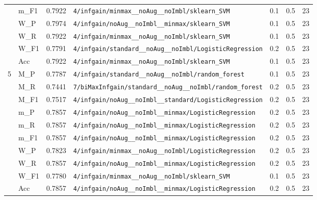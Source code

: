 \begin{table}[htbp]
\begin{tabular}{|c|l|c|>{\ttfamily\footnotesize}p{7.2cm}|c|c|c|}
 & m\_F1 & 0.7922 & \texttt{4/infgain/minmax\_\_noAug\_\_noImbl/sklearn\_SVM} & 0.1 & 0.5  & 23 \\ 
 & W\_P & 0.7974 & \texttt{4/infgain/noAug\_\_noImbl\_\_minmax/sklearn\_SVM} & 0.1 & 0.5  & 23 \\ 
 & W\_R & 0.7922 & \texttt{4/infgain/minmax\_\_noAug\_\_noImbl/sklearn\_SVM} & 0.1 & 0.5  & 23 \\ 
 & W\_F1 & 0.7791 & \texttt{4/infgain/standard\_\_noAug\_\_noImbl/LogisticRegression} & 0.2 & 0.5  & 23 \\ 
 & Acc & 0.7922 & \texttt{4/infgain/minmax\_\_noAug\_\_noImbl/sklearn\_SVM} & 0.1 & 0.5  & 23 \\ 
\hline
\multirow{10}{*}{5} & M\_P & 0.7787 & \texttt{4/infgain/standard\_\_noAug\_\_noImbl/random\_forest} & 0.1 & 0.5  & 23 \\ 
 & M\_R & 0.7441 & \texttt{7/biMaxInfgain/standard\_\_noAug\_\_noImbl/random\_forest} & 0.2 & 0.5  & 23 \\ 
 & M\_F1 & 0.7517 & \texttt{4/infgain/noAug\_\_noImbl\_\_standard/LogisticRegression} & 0.2 & 0.5  & 23 \\ 
 & m\_P & 0.7857 & \texttt{4/infgain/noAug\_\_noImbl\_\_minmax/LogisticRegression} & 0.2 & 0.5  & 23 \\ 
 & m\_R & 0.7857 & \texttt{4/infgain/noAug\_\_noImbl\_\_minmax/LogisticRegression} & 0.2 & 0.5  & 23 \\ 
 & m\_F1 & 0.7857 & \texttt{4/infgain/noAug\_\_noImbl\_\_minmax/LogisticRegression} & 0.2 & 0.5  & 23 \\ 
 & W\_P & 0.7823 & \texttt{4/infgain/minmax\_\_noAug\_\_noImbl/LogisticRegression} & 0.2 & 0.5  & 23 \\ 
 & W\_R & 0.7857 & \texttt{4/infgain/noAug\_\_noImbl\_\_minmax/LogisticRegression} & 0.2 & 0.5  & 23 \\ 
 & W\_F1 & 0.7780 & \texttt{4/infgain/minmax\_\_noAug\_\_noImbl/sklearn\_SVM} & 0.1 & 0.5  & 23 \\ 
 & Acc & 0.7857 & \texttt{4/infgain/noAug\_\_noImbl\_\_minmax/LogisticRegression} & 0.2 & 0.5  & 23 \\ 
\hline
\end{tabular}
\end{table}